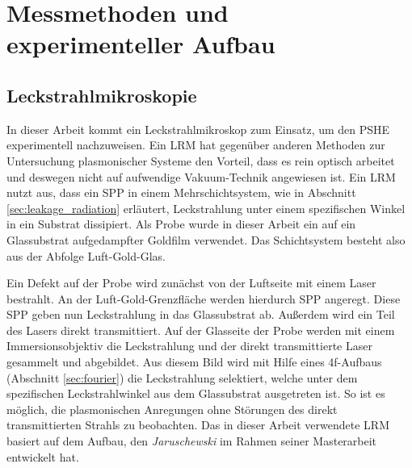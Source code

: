 \documentclass[titlepage,  ngerman]{article}
\begin{document}
	
	\section{Messmethoden und experimenteller Aufbau}
	\subsection{Leckstrahlmikroskopie}
	In dieser Arbeit kommt ein Leckstrahlmikroskop zum Einsatz, um den PSHE experimentell nachzuweisen. Ein LRM hat gegenüber anderen Methoden zur Untersuchung plasmonischer Systeme den Vorteil, dass es rein optisch arbeitet und deswegen nicht auf aufwendige Vakuum-Technik angewiesen ist. Ein LRM nutzt aus, dass ein SPP in einem Mehrschichtsystem, wie in Abschnitt \ref{sec:leakage_radiation} erläutert, Leckstrahlung unter einem spezifischen Winkel in ein Substrat dissipiert. Als Probe wurde in dieser Arbeit ein auf ein Glassubstrat aufgedampfter Goldfilm verwendet. Das Schichtsystem besteht also aus der Abfolge Luft-Gold-Glas.
	
	Ein Defekt auf der Probe wird zunächst von der Luftseite mit einem Laser bestrahlt. An der Luft-Gold-Grenzfläche werden hierdurch SPP angeregt. Diese SPP geben nun Leckstrahlung in das Glassubstrat ab.
	Außerdem wird ein Teil des Lasers direkt transmittiert. Auf der Glasseite der Probe werden mit einem Immersionsobjektiv die Leckstrahlung und der direkt transmittierte Laser gesammelt und abgebildet.	
	Aus diesem Bild wird mit Hilfe eines 4f-Aufbaus (Abschnitt \ref{sec:fourier}) die Leckstrahlung selektiert, welche unter dem spezifischen Leckstrahlwinkel aus dem Glassubstrat ausgetreten ist. So ist es möglich, die plasmonischen Anregungen ohne Störungen des direkt transmittierten Strahls zu beobachten. Das in dieser Arbeit verwendete LRM basiert auf dem Aufbau, den \textit{Jaruschewski} im Rahmen seiner Masterarbeit \cite{Jaruschewski.2020} entwickelt hat.
\end{document}
